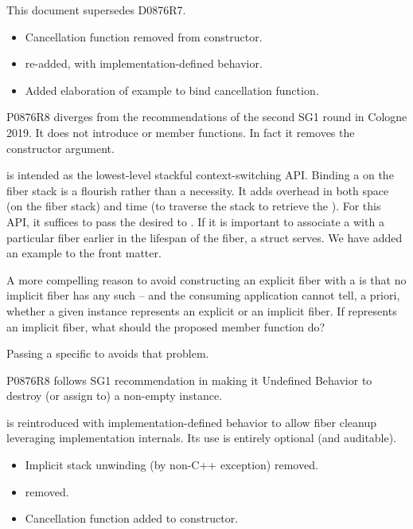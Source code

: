 \label{history}
This document supersedes D0876R7.


\begin{itemize}
    \item Cancellation function removed from \fiber constructor.
    \item \unwindfib re-added, with implementation-defined behavior.
    \item Added elaboration of  example to bind cancellation
          function.
\end{itemize}

P0876R8 diverges from the recommendations of the second SG1 round in Cologne
2019. It does not introduce  or 
member functions. In fact it removes the \cancelfn constructor argument.

\fiber is intended as the lowest-level stackful context-switching API. Binding
a \cancelfn on the fiber stack is a flourish rather than a necessity. It adds
overhead in both space (on the fiber stack) and time (to traverse the stack to
retrieve the \cancelfn). For this API, it suffices to pass the desired
\cancelfn to \someresumewith. If it is important to associate a \cancelfn with
a particular fiber earlier in the lifespan of the fiber, a struct serves. We
have added an example to the front matter.

A more compelling reason to avoid constructing an explicit fiber with
a \cancelfn is that no implicit fiber has any such \cancelfn -- and the
consuming application cannot tell, a priori, whether a given \fiber instance
represents an explicit or an implicit fiber. If  represents an
implicit fiber, what should the proposed  member function do?

Passing a specific \cancelfn to \someresumewith avoids that problem.

P0876R8 follows SG1 recommendation in making it Undefined Behavior to destroy
(or assign to) a non-empty \fiber instance.

\unwindfib is reintroduced with implementation-defined behavior to allow fiber
cleanup leveraging implementation internals. Its use is entirely optional (and
auditable). 


\begin{itemize}
    \item Implicit stack unwinding (by non-C++ exception) removed.
    \item \unwindfib removed.
    \item Cancellation function added to \fiber constructor.
\end{itemize}

